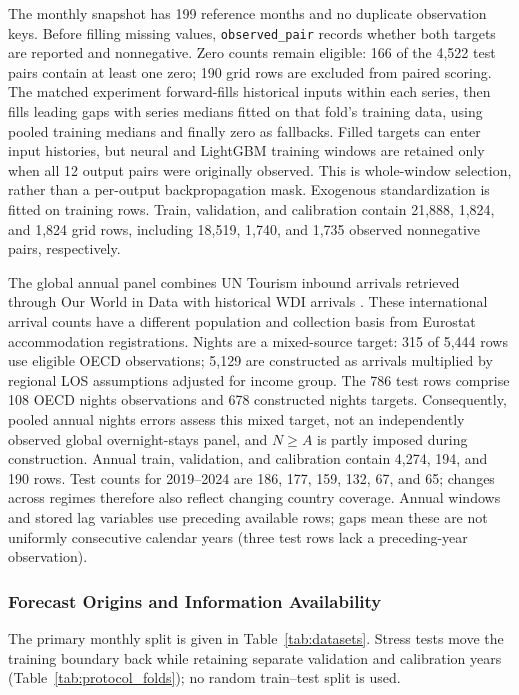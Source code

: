\documentclass[sigconf]{acmart}
\begin{document}
The monthly snapshot has 199 reference months and no duplicate observation keys. Before filling missing values, \texttt{observed\_pair} records whether both targets are reported and nonnegative. Zero counts remain eligible: 166 of the 4,522 test pairs contain at least one zero; 190 grid rows are excluded from paired scoring. The matched experiment forward-fills historical inputs within each series, then fills leading gaps with series medians fitted on that fold's training data, using pooled training medians and finally zero as fallbacks. Filled targets can enter input histories, but neural and LightGBM training windows are retained only when all 12 output pairs were originally observed. This is whole-window selection, rather than a per-output backpropagation mask. Exogenous standardization is fitted on training rows. Train, validation, and calibration contain 21,888, 1,824, and 1,824 grid rows, including 18,519, 1,740, and 1,735 observed nonnegative pairs, respectively.

The global annual panel combines UN Tourism inbound arrivals retrieved through Our World in Data with historical WDI arrivals \cite{un_tourism_database,owid_tourist_arrivals,worldbank_arrivals_metadata}. These international arrival counts have a different population and collection basis from Eurostat accommodation registrations. Nights are a mixed-source target: 315 of 5,444 rows use eligible OECD observations; 5,129 are constructed as arrivals multiplied by regional LOS assumptions adjusted for income group. The 786 test rows comprise 108 OECD nights observations and 678 constructed nights targets. Consequently, pooled annual nights errors assess this mixed target, not an independently observed global overnight-stays panel, and $N\geq A$ is partly imposed during construction. Annual train, validation, and calibration contain 4,274, 194, and 190 rows. Test counts for 2019--2024 are 186, 177, 159, 132, 67, and 65; changes across regimes therefore also reflect changing country coverage. Annual windows and stored lag variables use preceding available rows; gaps mean these are not uniformly consecutive calendar years (three test rows lack a preceding-year observation).

\subsubsection{Forecast Origins and Information Availability}
The primary monthly split is given in Table~\ref{tab:datasets}. Stress tests move the training boundary back while retaining separate validation and calibration years (Table~\ref{tab:protocol_folds}); no random train--test split is used.
\end{document}
